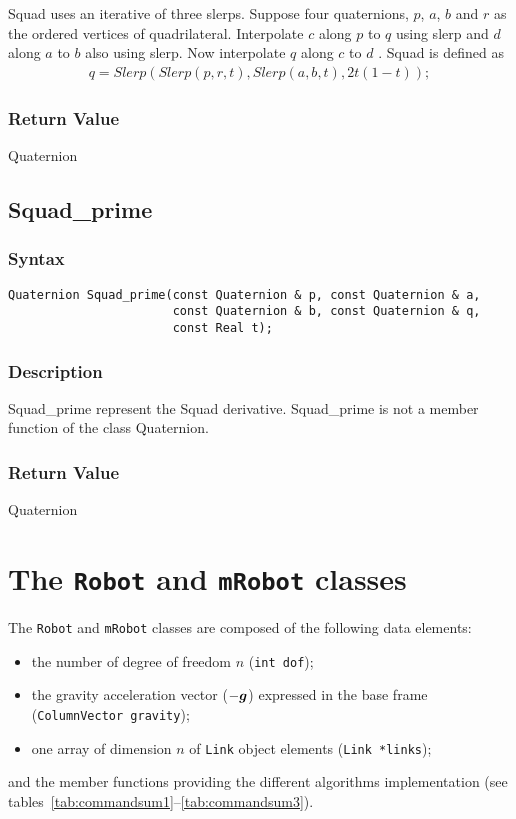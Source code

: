 \documentclass[dvips,11pt,fleqn]{report}
\newcommand{\mbold}[1]{\mbox{\boldmath $ #1 $}}
\begin{document}
Squad uses an iterative of three slerps. Suppose four quaternions,
$p$, $a$, $b$ and $r$ as the ordered vertices of quadrilateral.
Interpolate $c$ along $p$ to $q$ using slerp and $d$ along $a$ to $b$
also using slerp. Now interpolate $q$ along $c$ to $d$ \cite{Dam98}.
Squad is defined as
\begin{eqnarray}
  q = Slerp(Slerp(p,r,t),Slerp(a,b,t),2t(1-t));
\end{eqnarray}
 
\subsubsection*{Return Value}

Quaternion

\newpage

\subsection*{Squad\_prime}

\subsubsection*{Syntax}
\begin{verbatim}
Quaternion Squad_prime(const Quaternion & p, const Quaternion & a, 
                       const Quaternion & b, const Quaternion & q, 
                       const Real t);
\end{verbatim}
\subsubsection{Description}
Squad\_prime represent the Squad derivative.  Squad\_prime is not a
member function of the class Quaternion.

\subsubsection*{Return Value}

Quaternion

\newpage

\section{The \texttt{Robot} and \texttt{mRobot} classes}

The \texttt{Robot} and \texttt{mRobot} classes are composed of the
following data elements:
\begin{itemize}
\item the number of degree of freedom $n$ ({\tt int dof});
\item the gravity acceleration vector ($-\mbold{g}$) expressed in the
  base frame \\({\tt ColumnVector gravity});
\item one array of dimension $n$ of \texttt{Link} object elements
  ({\tt Link *links});
\end{itemize}
and the member functions providing the different algorithms implementation 
(see tables~\ref{tab:commandsum1}--\ref{tab:commandsum3}).
\end{document}
